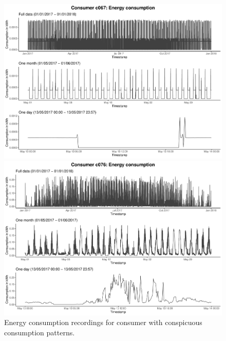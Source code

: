 \begin{figure}
    \begin{minipage}[ht]{\dimexpr.5\textheight-0.15em}
    \includegraphics[width=\textwidth]{thesis/graphs/timeseries/c067_cons.pdf}
    \end{minipage}
    \begin{minipage}[ht]{\dimexpr.5\textheight-0.15em}
    \includegraphics[width=\textwidth]{thesis/graphs/timeseries/c076_cons.pdf}
    \end{minipage}
    
    \caption[Energy consumption recordings for consumer with conspicuous consumption patterns]{Energy consumption recordings for consumer with conspicuous consumption patterns.}
    \label{Fig:consenergycons_peculiar}
\end{figure}

